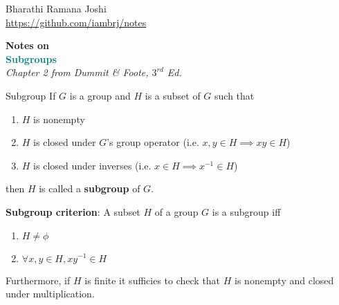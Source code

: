 \documentclass[titlepage, 12pt]{article}
\newcommand*{\logo}{\fbox{$\mathfrak{BRJ}$}}
\begin{document}
\begin{titlepage} %

	\raggedleft%

	\vspace*{\baselineskip} %

	{Bharathi Ramana Joshi\\\url{https://github.com/iambrj/notes}} %

	\vspace*{0.167\textheight} %

	\textbf{\LARGE Notes on}\\[\baselineskip] %

	\textbf{\textcolor{teal}{\huge Subgroups}}\\[\baselineskip] %

    {\Large \textit{Chapter 2 from Dummit \& Foote, $3^{rd}$ Ed.}} %

	\vfill %

	{\large \logo} %

	\vspace*{3\baselineskip} %

\end{titlepage}

\begin{definition}{Subgroup}{}
    If $G$ is a group and $H$ is a subset of $G$ such that
    \begin{enumerate}
        \item $H$ is nonempty
        \item $H$ is closed under $G$'s group operator (i.e. $x, y\in H\implies
            xy\in H$)
        \item $H$ is closed under inverses (i.e. $x\in H \implies x^{-1} \in H$)
    \end{enumerate}
    then $H$ is called a \textbf{subgroup} of $G$.
\end{definition}

\textbf{Subgroup criterion}: A subset $H$ of a group $G$ is a subgroup iff
\begin{enumerate}
    \item $H\neq\phi$
    \item $\forall x, y\in H, xy^{-1}\in H$
\end{enumerate}
Furthermore, if $H$ is finite it sufficies to check that $H$ is nonempty and
closed under multiplication.
\end{document}
